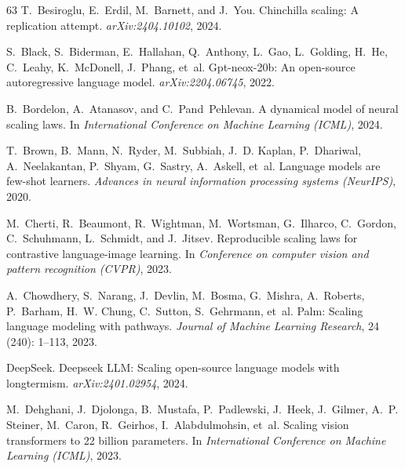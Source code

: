 \documentclass{article}
\theoremstyle{plain}
\theoremstyle{definition}
\theoremstyle{remark}
\begin{document}
\begin{thebibliography}{63}
T.~Besiroglu, E.~Erdil, M.~Barnett, and J.~You.
\newblock Chinchilla scaling: A replication attempt.
\newblock \emph{arXiv:2404.10102}, 2024.

S.~Black, S.~Biderman, E.~Hallahan, Q.~Anthony, L.~Gao, L.~Golding, H.~He, C.~Leahy, K.~McDonell, J.~Phang, et~al.
\newblock Gpt-neox-20b: An open-source autoregressive language model.
\newblock \emph{arXiv:2204.06745}, 2022.

B.~Bordelon, A.~Atanasov, and C.~Pand~Pehlevan.
\newblock A dynamical model of neural scaling laws.
\newblock In \emph{International Conference on Machine Learning (ICML)}, 2024.

T.~Brown, B.~Mann, N.~Ryder, M.~Subbiah, J.~D. Kaplan, P.~Dhariwal, A.~Neelakantan, P.~Shyam, G.~Sastry, A.~Askell, et~al.
\newblock Language models are few-shot learners.
\newblock \emph{Advances in neural information processing systems (NeurIPS)}, 2020.

M.~Cherti, R.~Beaumont, R.~Wightman, M.~Wortsman, G.~Ilharco, C.~Gordon, C.~Schuhmann, L.~Schmidt, and J.~Jitsev.
\newblock Reproducible scaling laws for contrastive language-image learning.
\newblock In \emph{Conference on computer vision and pattern recognition (CVPR)}, 2023.

A.~Chowdhery, S.~Narang, J.~Devlin, M.~Bosma, G.~Mishra, A.~Roberts, P.~Barham, H.~W. Chung, C.~Sutton, S.~Gehrmann, et~al.
\newblock Palm: Scaling language modeling with pathways.
\newblock \emph{Journal of Machine Learning Research}, 24 (240): 1--113, 2023.

DeepSeek.
\newblock Deepseek {LLM}: Scaling open-source language models with longtermism.
\newblock \emph{arXiv:2401.02954}, 2024.

M.~Dehghani, J.~Djolonga, B.~Mustafa, P.~Padlewski, J.~Heek, J.~Gilmer, A.~P. Steiner, M.~Caron, R.~Geirhos, I.~Alabdulmohsin, et~al.
\newblock Scaling vision transformers to 22 billion parameters.
\newblock In \emph{International Conference on Machine Learning (ICML)}, 2023.


\end{thebibliography}
\end{document}
